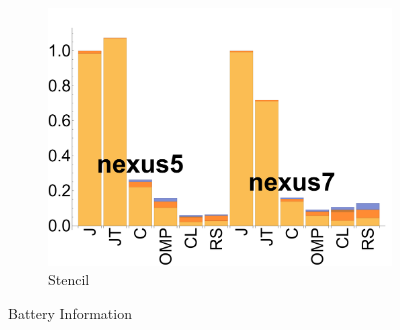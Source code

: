 \begin{figure}[ht]
  \begin{subfigure}[b]{0.25\textwidth}
      \centering
      \includegraphics[width=\textwidth]{data/bbattery_stencil.pdf}
      \caption{Stencil} \label{fig:b_Stencil}
  \end{subfigure}

  \caption{Battery Information}
\end{figure}


% 
% 
% 
% 
% 
% 
% 
% 

